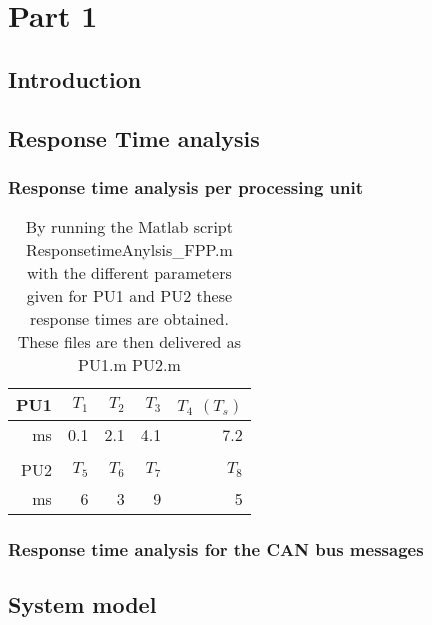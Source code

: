 \chapter{Part 1}

\section{Introduction}

\section{Response Time analysis}



\subsection{Response time analysis per processing unit}

\begin{table}[htbp]
	\centering
	\caption{By running the Matlab script ResponsetimeAnylsis\_FPP.m with the different parameters given for PU1 and PU2 these response times are obtained. These files are then delivered as PU1.m PU2.m}
	\begin{tabular}{rrrrr}
		\toprule
		PU1     & $T_1$    & $T_2$    & $T_3$    & $T_4$  $(T_s)$ \\
		\midrule
		ms      & 0.1     & 2.1     & 4.1     & 7.2 \\
		&         &         &         &  \\
		\toprule
		PU2     & $T_5$    & $T_6$    & $T_7$    & $T_8$ \\
		\midrule
		ms      & 6       & 3       & 9       & 5 \\
		
	\end{tabular}%
	\label{tab:addlabel}%
\end{table}%


\subsection{ Response time analysis for the CAN bus messages}

\section{System model}

